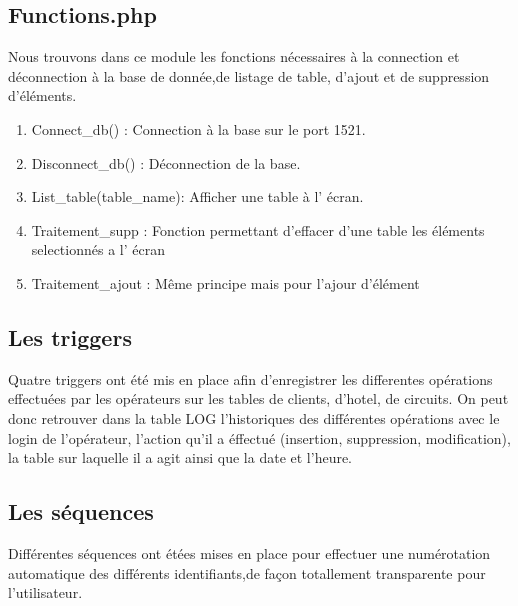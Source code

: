 \subsection{Functions.php}
Nous trouvons dans ce module les fonctions n\'ecessaires \`a la connection et d\'econnection \`a la base de donn\'ee,de listage de table, d'ajout et de suppression d'\'el\'ements.

\begin{enumerate}
\item Connect\_db() : Connection \`a la base sur le port 1521.
\item Disconnect\_db() : D\'econnection de la base.
\item List\_table(table\_name): Afficher une table \`a l' \'ecran.
\item Traitement\_supp : Fonction permettant d'effacer d'une table les \'el\'ements selectionn\'es a l' \'ecran
\item Traitement\_ajout : M\^eme principe mais pour l'ajour d'\'el\'ement
\end{enumerate}

\subsection{Les triggers}
Quatre triggers ont été mis en place afin d'enregistrer les differentes opérations effectuées par les opérateurs sur les tables de clients, d'hotel, de circuits.
On peut donc retrouver dans la table LOG l'historiques des différentes opérations avec le login de l'opérateur, l'action qu'il a éffectué (insertion, suppression, modification), la table sur laquelle il a agit ainsi que la date et l'heure.

\subsection{Les séquences}
Différentes séquences ont étées mises en place pour effectuer une numérotation automatique des différents identifiants,de façon totallement transparente pour l'utilisateur.



\normalsize



\newpage
